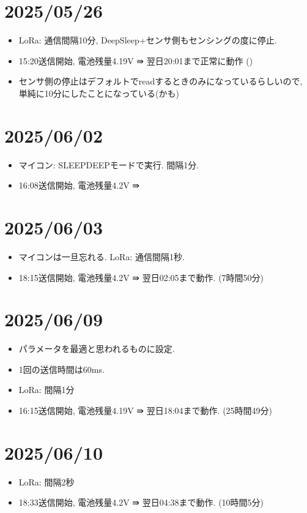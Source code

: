 \section{2025/05/26}
\begin{itemize}
    \item LoRa: 通信間隔10分, DeepSleep+センサ側もセンシングの度に停止.
    \item 15:20送信開始, 電池残量4.19V ⇛ 翌日20:01まで正常に動作 ()
    \item センサ側の停止はデフォルトでreadするときのみになっているらしいので, 単純に10分にしたことになっている(かも)
\end{itemize}

\section{2025/06/02}
\begin{itemize}
    \item マイコン: SLEEPDEEPモードで実行. 間隔1分.
    \item 16:08送信開始, 電池残量4.2V ⇛ 
\end{itemize}


\section{2025/06/03}
\begin{itemize}
    \item マイコンは一旦忘れる. LoRa: 通信間隔1秒. 
    \item 18:15送信開始, 電池残量4.2V ⇛ 翌日02:05まで動作. (7時間50分)
\end{itemize}

\section{2025/06/09}
\begin{itemize}
    \item パラメータを最適と思われるものに設定. 
    \item 1回の送信時間は60ms. 
    \item LoRa: 間隔1分
    \item 16:15送信開始, 電池残量4.19V ⇛ 翌日18:04まで動作. (25時間49分)
\end{itemize}

\section{2025/06/10}
\begin{itemize}
    \item LoRa: 間隔2秒
    \item 18:33送信開始, 電池残量4.2V ⇛ 翌日04:38まで動作. (10時間5分)
\end{itemize}

